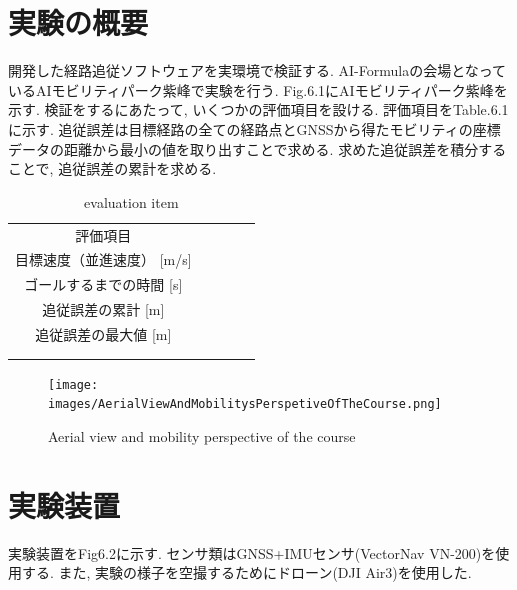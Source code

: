 
\section{実験の概要}
開発した経路追従ソフトウェアを実環境で検証する.
AI-Formulaの会場となっているAIモビリティパーク紫峰で実験を行う.
Fig.6.1にAIモビリティパーク紫峰を示す.
検証をするにあたって, いくつかの評価項目を設ける. 
評価項目をTable.6.1に示す.
追従誤差は目標経路の全ての経路点とGNSSから得たモビリティの座標データの距離から最小の値を取り出すことで求める.
求めた追従誤差を積分することで, 追従誤差の累計を求める.

\begin{table}[H]
  \centering
  \caption{evaluation item}
  \begin{tabular}{cclll}
  \cline{1-1}
  評価項目                    &  &  &  &  \\
  \cline{1-2}
  目標速度（並進速度） {[}m/s{]}    &  &  &  &  \\
  ゴールするまでの時間 {[}s{]}            &  &  &  &  \\
  追従誤差の累計 {[}m{]} &  &  &  &  \\
  追従誤差の最大値 {[}m{]}  &  &  &  &  \\
  \multicolumn{1}{l}{}    &  &  &  &  \\
  \multicolumn{1}{l}{}    &  &  &  & 
  \end{tabular}
\end{table}


\begin{figure}[H]
  \centering
 \texttt{[image: images/AerialViewAndMobilitysPerspetiveOfTheCourse.png]}
 \caption{Aerial view and mobility perspective of the course}
 \label{fig:course}
\end{figure}

\section{実験装置}
実験装置をFig6.2に示す.
センサ類はGNSS+IMUセンサ(VectorNav VN-200)を使用する.
また, 実験の様子を空撮するためにドローン(DJI Air3)を使用した.

